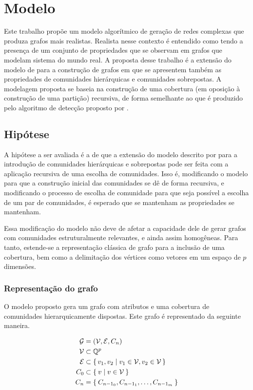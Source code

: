 \documentclass[notes.tex]{subfiles}
\begin{document}
\chapter{Modelo}

Este trabalho propõe um modelo algorítmico de geração de redes complexas que produza grafos mais realistas.
Realista nesse contexto é entendido como tendo a presença de um conjunto de propriedades que se observam em grafos que modelam sistema do mundo real.
A proposta desse trabalho é a extensão do modelo de  para a construção de grafos em que se apresentem também as propriedades de comunidades hierárquicas e comunidades sobrepostas.
A modelagem proposta se baseia na construção de uma cobertura (em oposição à construção de uma partição) recursiva, de forma semelhante ao que é produzido pelo algoritmo de detecção proposto por .


\section{Hipótese}

A hipótese a ser avaliada é a de que a extensão do modelo descrito por  para a introdução de comunidades hierárquicas e sobrepostas pode ser feita com a aplicação recursiva de uma escolha de comunidades.
Isso é, modificando o modelo para que a construção inicial das comunidades se dê de forma recursiva, e modificando o processo de escolha de comunidade para que seja possível a escolha de um par de comunidades, é esperado que se mantenham as propriedades se mantenham.

Essa modificação do modelo não deve de afetar a capacidade dele de gerar grafos com comunidades estruturalmente relevantes, e ainda assim homogêneas.
Para tanto, estende-se a representação clássica de grafo para a inclusão de uma cobertura, bem como a delimitação dos vértices como vetores em um espaço de $p$ dimensões.

\subsection{Representação do grafo}

O modelo proposto gera um grafo com atributos e uma cobertura de comunidades hierarquicamente dispostas.
Este grafo é representado da seguinte maneira.

\begin{equation}
\begin{split}
    \operatorname{\mathcal{G}} &= (\operatorname{\mathcal{V}}, \operatorname{\mathcal{E}}, C_n) \\
    \operatorname{\mathcal{V}} &\subset  \mathbb{Q}^{p} \\
    \operatorname{\mathcal{E}} &\subset \set{v_1, v_2 | v_1 \in \operatorname{\mathcal{V}}, v_2 \in \operatorname{\mathcal{V}}} \\
     C_0 &\subset \Set{v | v \in \operatorname{\mathcal{V}}} \\
     C_n &= \Set{C_{n-1_0}, C_{n-1_1}, \ldots, C_{n-1_m}} \\
\end{split}
\end{equation}
\end{document}
